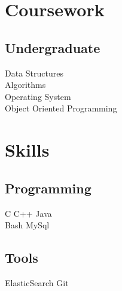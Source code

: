 \documentclass[]{deedy-resume-openfont}
\begin{document}
\begin{minipage}[t]{0.33\textwidth}
\section{Coursework}
\subsection{Undergraduate}
\textmd{Data Structures} \\
\textmd{Algorithms} \\
\textmd{Operating System} \\
\textmd{Object Oriented Programming} \\
\sectionsep

\section{Skills}
\subsection{Programming}
\textbullet{} \textmd{C} 
\textbullet{} \textmd{C++}
\textbullet{} \textmd{Java}\\
\sectionsep
{}
\textbullet{} \textmd{Bash} 
\textbullet{} \textmd{MySql} \\
\sectionsep
\subsection{Tools}
\textbullet{} \textmd{ElasticSearch}  
\textbullet{} \textmd{Git}  \\

%
%

\end{minipage} 
\hfill
\end{document}
